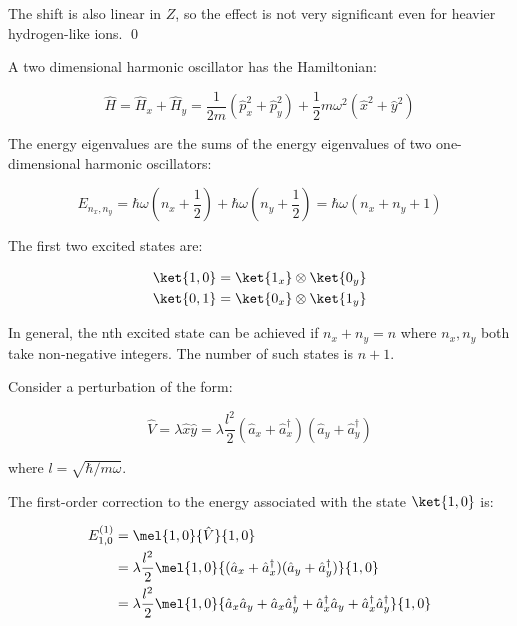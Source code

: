 \documentclass[12pt]{article}
\begin{document}
The shift is also linear in $Z$, so the effect is not very significant even for heavier hydrogen-like ions.
\qed


A two dimensional harmonic oscillator has the Hamiltonian:

\begin{equation}
    \hat{H} = \hat{H}_{x} + \hat{H}_{y} = \frac{1}{2m} \left( \hat{p}_{x}^{2} + \hat{p}_{y}^{2} \right) + \frac{1}{2} m\omega^{2} \left( \hat{x}^{2} + \hat{y}^{2} \right)
\end{equation}

The energy eigenvalues are the sums of the energy eigenvalues of two one-dimensional harmonic oscillators:

\begin{equation}
    E_{n_{x}, n_{y}} = \hbar \omega \left( n_{x} + \frac{1}{2} \right) + \hbar \omega \left( n_{y} + \frac{1}{2} \right) = \hbar \omega \left( n_{x} + n_{y} + 1 \right)
\end{equation}

The first two excited states are:

\begin{equation}
    \begin{split}
        \ket{1, 0} &= \ket{1_{x}} \otimes \ket{0_{y}} \\
        \ket{0, 1} &= \ket{0_{x}} \otimes \ket{1_{y}}
    \end{split}
\end{equation}

In general, the nth excited state can be achieved if $n_{x} + n_{y} = n$ where $n_{x}, n_{y}$ both take non-negative integers. The number of such states is $n+1$.

Consider a perturbation of the form:

\begin{equation}
    \hat{V} = \lambda \hat{x}\hat{y} = \lambda \frac{l^{2}}{2} (\hat{a}_{x} + \hat{a}_{x}^{\dagger})(\hat{a}_{y} + \hat{a}_{y}^{\dagger})
\end{equation}

where $l = \sqrt{\hbar/m\omega}$.

The first-order correction to the energy associated with the state $\ket{1, 0}$ is:

\begin{equation}
    \begin{split}
        E_{1, 0}^{(1)} &= \mel{1, 0}{\hat{V}}{1, 0} \\
        &= \lambda \frac{l^{2}}{2} \mel{1, 0}{(\hat{a}_{x} + \hat{a}_{x}^{\dagger})(\hat{a}_{y} + \hat{a}_{y}^{\dagger})}{1, 0} \\
        &= \lambda \frac{l^{2}}{2}  \mel{1, 0}{\hat{a}_{x} \hat{a}_{y} + \hat{a}_{x} \hat{a}_{y}^{\dagger} + \hat{a}_{x}^{\dagger} \hat{a}_{y} + \hat{a}_{x}^{\dagger} \hat{a}_{y}^{\dagger}}{1, 0} \\
    \end{split}
\end{equation}
\end{document}
